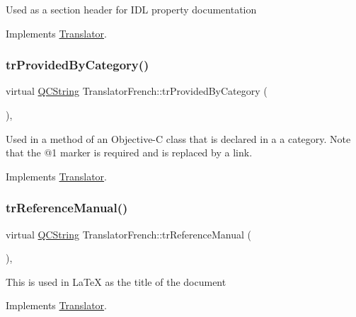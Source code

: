 Used as a section header for I\+DL property documentation 

Implements \mbox{\hyperlink{class_translator}{Translator}}.

\mbox{\label{class_translator_french_adce3437bd93005bb129bc612dc7035b5}} 
\subsubsection{\texorpdfstring{trProvidedByCategory()}{trProvidedByCategory()}}
{\footnotesize\ttfamily virtual \mbox{\hyperlink{class_q_c_string}{Q\+C\+String}} Translator\+French\+::tr\+Provided\+By\+Category (\begin{DoxyParamCaption}{ }\end{DoxyParamCaption})\hspace{0.3cm}{\ttfamily [inline]}, {\ttfamily [virtual]}}

Used in a method of an Objective-\/C class that is declared in a a category. Note that the @1 marker is required and is replaced by a link. 

Implements \mbox{\hyperlink{class_translator}{Translator}}.

\mbox{\label{class_translator_french_aeac5f991eff1e2c0525c314e82fe71d8}} 
\subsubsection{\texorpdfstring{trReferenceManual()}{trReferenceManual()}}
{\footnotesize\ttfamily virtual \mbox{\hyperlink{class_q_c_string}{Q\+C\+String}} Translator\+French\+::tr\+Reference\+Manual (\begin{DoxyParamCaption}{ }\end{DoxyParamCaption})\hspace{0.3cm}{\ttfamily [inline]}, {\ttfamily [virtual]}}

This is used in La\+TeX as the title of the document 

Implements \mbox{\hyperlink{class_translator}{Translator}}.

\mbox{\label{class_translator_french_af0f7d9ad1591f261adbcf2257bfcdfd5}} 
